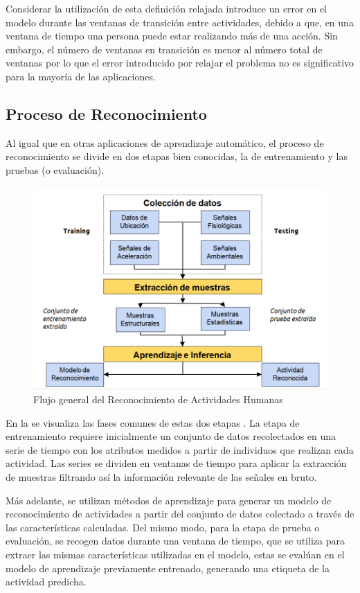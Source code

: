 Considerar la utilización de esta definición relajada introduce un
error en el modelo durante las ventanas de transición entre actividades,
debido a que, en una ventana de tiempo una persona puede estar realizando
más de una acción. Sin embargo, el número de ventanas en transición
es menor al número total de ventanas por lo que el error introducido
por relajar el problema no es significativo para la mayoría de las
aplicaciones.

\subsection{Proceso de Reconocimiento }

\label{sec262:proceso-har}Al igual que en otras aplicaciones de aprendizaje
automático, el proceso de reconocimiento se divide en dos etapas bien
conocidas, la de entrenamiento y las pruebas (o evaluación).

\begin{figure}[!htbp]
\centering{} \includegraphics[width=0.7\linewidth]{capitulo-2/graphics/harsystem}
\caption[Flujograma]{\label{fig2:harsystem}Flujo general del Reconocimiento de Actividades
Humanas}
 
\end{figure}

En la  se visualiza las fases comunes de estas
dos etapas \cite{LaraLabrador2013}. La etapa de entrenamiento requiere
inicialmente un conjunto de datos recolectados en una serie de tiempo
con los atributos medidos a partir de individuos que realizan cada
actividad. Las series se dividen en ventanas de tiempo para aplicar
la extracción de muestras filtrando así la información relevante de
las señales en bruto. 

Más adelante, se utilizan métodos de aprendizaje para generar un modelo
de reconocimiento de actividades a partir del conjunto de datos colectado
a través de las características calculadas. Del mismo modo, para la
etapa de prueba o evaluación, se recogen datos durante una ventana
de tiempo, que se utiliza para extraer las mismas características
utilizadas en el modelo, estas se evalúan en el modelo de aprendizaje
previamente entrenado, generando una etiqueta de la actividad predicha.

